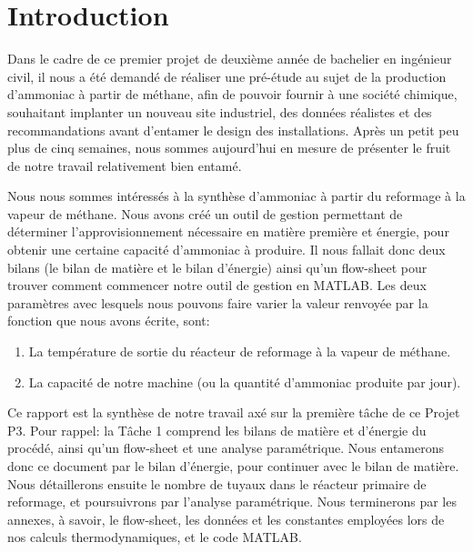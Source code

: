 \section{Introduction}

Dans le cadre de ce premier projet de deuxième année de bachelier en ingénieur civil, il nous a été demandé
de réaliser une pré-étude au sujet de la production d'ammoniac à partir de méthane, afin de pouvoir fournir
à une société chimique, souhaitant implanter un nouveau site industriel, des données réalistes et des recommandations
avant d’entamer le design des installations. Après un petit peu plus de cinq semaines, nous sommes aujourd'hui en
mesure de présenter le fruit de notre travail relativement bien entamé. 

Nous nous sommes intéressés à la synthèse d’ammoniac à partir du reformage à la vapeur de méthane. Nous avons
créé un outil de gestion permettant de déterminer l’approvisionnement nécessaire en matière première et énergie, pour
obtenir une certaine capacité d'ammoniac à produire. Il nous fallait donc deux bilans (le bilan de matière et le
bilan d'énergie) ainsi qu'un flow-sheet pour trouver comment commencer notre outil de gestion en \textsc{MATLAB}. Les
deux paramètres avec lesquels nous pouvons faire varier la valeur renvoyée par la fonction que nous avons écrite, sont:

\begin{enumerate}
\item La température de sortie du réacteur de reformage à la vapeur de méthane.
\item La capacité de notre machine (ou la quantité d'ammoniac  produite par jour).
\end{enumerate}


Ce rapport est la synthèse de notre travail axé sur la première tâche de ce Projet P3. Pour rappel: la Tâche 1 comprend
les bilans de matière et d’énergie du procédé, ainsi qu'un flow-sheet et une analyse paramétrique. Nous entamerons donc ce
document par le bilan d'énergie, pour continuer avec le bilan de matière. Nous détaillerons ensuite le nombre de tuyaux
dans le réacteur primaire de reformage, et poursuivrons par l'analyse paramétrique. Nous terminerons par les annexes, à
savoir, le flow-sheet, les données et les constantes employées lors de nos calculs thermodynamiques, et le code \textsc{MATLAB}.		
